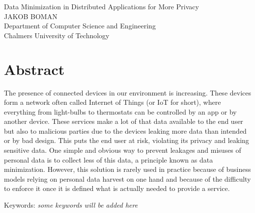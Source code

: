 Data Minimization in Distributed Applications for More Privacy\\
JAKOB BOMAN\\
Department of Computer Science and Engineering\\
Chalmers University of Technology \setlength{\parskip}{0.5cm}

\thispagestyle{plain}			%
\setlength{\parskip}{0pt plus 1.0pt}

\section*{Abstract}

The presence of connected devices in our environment is increasing. These devices form a network often called Internet of Things (or IoT for short), where everything from light-bulbs to thermostats can be controlled by an app or by another device. These services make a lot of that data available to the end user but also to malicious parties due to the devices leaking more data than intended or by bad design. This puts the end user at risk, violating its privacy and leaking sensitive data. One simple and obvious way to prevent leakages and misuses of personal data is to collect less of this data, a principle known as data minimization. However, this solution is rarely used in practice because of business models relying on personal data harvest on one hand and because of the difficulty to enforce it once it is defined what is actually needed to provide a service.

\vfill
Keywords: \textit{some keywords will be added here}

\newpage				%
\thispagestyle{empty}
\mbox{}